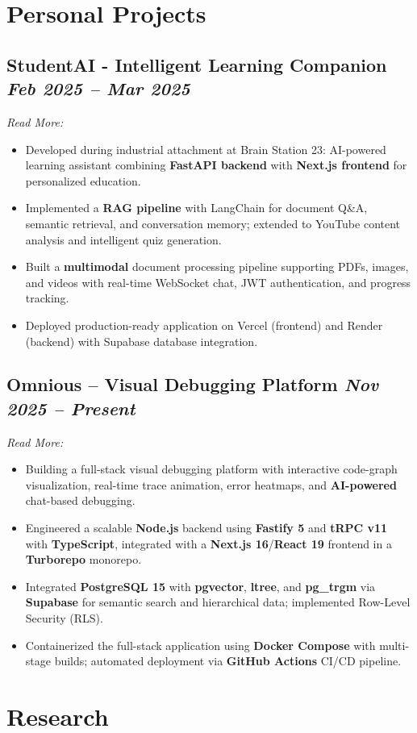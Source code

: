 \documentclass[10pt, a4paper]{article}
\newcommand{\datedsubsection}[2]{%
  \subsection*{#1 \hfill \small\textit{#2}}%
}
\newcommand{\resitem}[1]{\item #1} %
\begin{document}
\section{Personal Projects}
\datedsubsection{StudentAI - Intelligent Learning Companion}{Feb 2025 -- Mar 2025}
\textit{Read More:} \href{https://www.mehedi-hasan-maruf.me/projects/student-ai}{\faExternalLink*}
\begin{itemize}
    \resitem{Developed during industrial attachment at Brain Station 23: AI-powered learning assistant combining \textbf{FastAPI backend} with \textbf{Next.js frontend} for personalized education.}
    \resitem{Implemented a \textbf{RAG pipeline} with LangChain for document Q\&A, semantic retrieval, and conversation memory; extended to YouTube content analysis and intelligent quiz generation.}
    \resitem{Built a \textbf{multimodal} document processing pipeline supporting PDFs, images, and videos with real-time WebSocket chat, JWT authentication, and progress tracking.}
    \resitem{Deployed production-ready application on Vercel (frontend) and Render (backend) with Supabase database integration.}
\end{itemize}

\datedsubsection{Omnious -- Visual Debugging Platform}{Nov 2025 -- Present}
\textit{Read More:} \href{https://www.mehedi-hasan-maruf.me/projects/omnious}{\faExternalLink*}
\begin{itemize}
    \resitem{Building a full-stack visual debugging platform with interactive code-graph visualization, real-time trace animation, error heatmaps, and \textbf{AI-powered} chat-based debugging.}
    \resitem{Engineered a scalable \textbf{Node.js} backend using \textbf{Fastify 5} and \textbf{tRPC v11} with \textbf{TypeScript}, integrated with a \textbf{Next.js 16}/\textbf{React 19} frontend in a \textbf{Turborepo} monorepo.}
    \resitem{Integrated \textbf{PostgreSQL 15} with \textbf{pgvector}, \textbf{ltree}, and \textbf{pg\_trgm} via \textbf{Supabase} for semantic search and hierarchical data; implemented Row-Level Security (RLS).}
    \resitem{Containerized the full-stack application using \textbf{Docker Compose} with multi-stage builds; automated deployment via \textbf{GitHub Actions} CI/CD pipeline.}
\end{itemize}

\section{Research}
\end{document}
